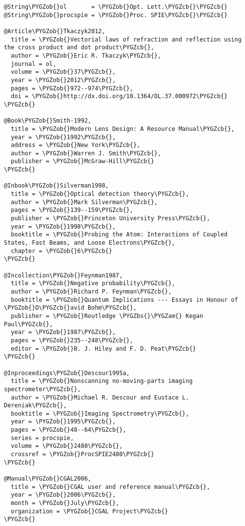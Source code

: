 \documentclass[letterpaper,10pt,english]{sphinxmanual}
\def\PYGZbs{\char`\\}
\def\PYGZob{\char`\{}
\def\PYGZcb{\char`\}}
\def\PYGZam{\char`\&}
\begin{document}
\begin{Verbatim}[commandchars=\\\{\}]
@String\PYGZob{}ol       = \PYGZob{}Opt. Lett.\PYGZcb{}\PYGZcb{}
@String\PYGZob{}procspie = \PYGZob{}Proc. SPIE\PYGZcb{}\PYGZcb{}

@Article\PYGZob{}Tkaczyk2012,
  title = \PYGZob{}Vectorial laws of refraction and reflection using the cross product and dot product\PYGZcb{},
  author = \PYGZob{}Eric R. Tkaczyk\PYGZcb{},
  journal = ol,
  volume = \PYGZob{}37\PYGZcb{},
  year = \PYGZob{}2012\PYGZcb{},
  pages = \PYGZob{}972--974\PYGZcb{},
  doi = \PYGZob{}http://dx.doi.org/10.1364/OL.37.000972\PYGZcb{}
\PYGZcb{}

@Book\PYGZob{}Smith-1992,
  title = \PYGZob{}Modern Lens Design: A Resource Manual\PYGZcb{},
  year = \PYGZob{}1992\PYGZcb{},
  address = \PYGZob{}New York\PYGZcb{},
  author = \PYGZob{}Warren J. Smith\PYGZcb{},
  publisher = \PYGZob{}McGraw-Hill\PYGZcb{}
\PYGZcb{}

@Inbook\PYGZob{}Silverman1998,
  title = \PYGZob{}Optical detection theory\PYGZcb{},
  author = \PYGZob{}Mark Silverman\PYGZcb{},
  pages = \PYGZob{}139--159\PYGZcb{},
  publisher = \PYGZob{}Princeton University Press\PYGZcb{},
  year = \PYGZob{}1998\PYGZcb{},
  booktitle = \PYGZob{}Probing the Atom: Interactions of Coupled States, Fast Beams, and Loose Electrons\PYGZcb{},
  chapter = \PYGZob{}6\PYGZcb{}
\PYGZcb{}

@Incollection\PYGZob{}Feynman1987,
  title = \PYGZob{}Negative probability\PYGZcb{},
  author = \PYGZob{}Richard P. Feynman\PYGZcb{},
  booktitle = \PYGZob{}Quantum Implications --- Essays in Honour of \PYGZob{}D\PYGZcb{}avid Bohm\PYGZcb{},
  publisher = \PYGZob{}Routledge \PYGZbs{}\PYGZam{} Kegan Paul\PYGZcb{},
  year = \PYGZob{}1987\PYGZcb{},
  pages = \PYGZob{}235--248\PYGZcb{},
  editor = \PYGZob{}B. J. Hiley and F. D. Peat\PYGZcb{}
\PYGZcb{}

@Inproceedings\PYGZob{}Descour1995a,
  title = \PYGZob{}Nonscanning no-moving-parts imaging spectrometer\PYGZcb{},
  author = \PYGZob{}Michael R. Descour and Eustace L. Dereniak\PYGZcb{},
  booktitle = \PYGZob{}Imaging Spectrometry\PYGZcb{},
  year = \PYGZob{}1995\PYGZcb{},
  pages = \PYGZob{}48--64\PYGZcb{},
  series = procspie,
  volume = \PYGZob{}2480\PYGZcb{},
  crossref = \PYGZob{}ProcSPIE2480\PYGZcb{}
\PYGZcb{}

@Manual\PYGZob{}CGAL2006,
  title = \PYGZob{}CGAL user and reference manual\PYGZcb{},
  year = \PYGZob{}2006\PYGZcb{},
  month = \PYGZob{}July\PYGZcb{},
  organization = \PYGZob{}CGAL Project\PYGZcb{}
\PYGZcb{}


\end{Verbatim}
\end{document}
